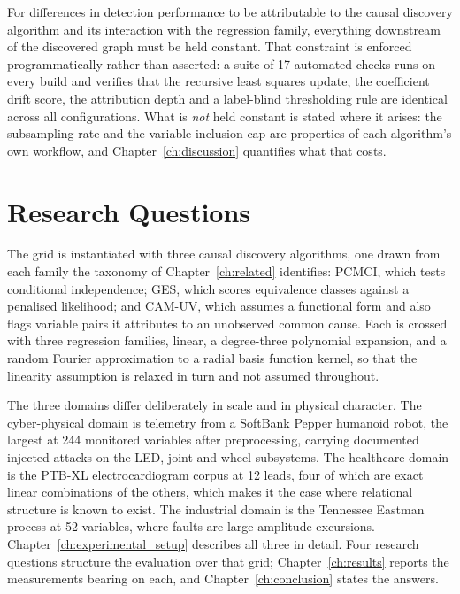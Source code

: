 For differences in detection performance to be attributable to the causal discovery algorithm and its interaction with the regression family, everything downstream of the discovered graph must be held constant. That constraint is enforced programmatically rather than asserted: a suite of 17 automated checks runs on every build and verifies that the recursive least squares update, the coefficient drift score, the attribution depth and a label-blind thresholding rule are identical across all configurations. What is \emph{not} held constant is stated where it arises: the subsampling rate and the variable inclusion cap are properties of each algorithm's own workflow, and Chapter~\ref{ch:discussion} quantifies what that costs.

\section{Research Questions}
\label{sec:rqs}

The grid is instantiated with three causal discovery algorithms, one drawn from each family the taxonomy of Chapter~\ref{ch:related} identifies: PCMCI, which tests conditional independence; GES, which scores equivalence classes against a penalised likelihood; and CAM-UV, which assumes a functional form and also flags variable pairs it attributes to an unobserved common cause. Each is crossed with three regression families, linear, a degree-three polynomial expansion, and a random Fourier approximation to a radial basis function kernel, so that the linearity assumption is relaxed in turn and not assumed throughout.

The three domains differ deliberately in scale and in physical character. The cyber-physical domain is telemetry from a SoftBank Pepper humanoid robot, the largest at 244 monitored variables after preprocessing, carrying documented injected attacks on the LED, joint and wheel subsystems. The healthcare domain is the PTB-XL electrocardiogram corpus at 12 leads, four of which are exact linear combinations of the others, which makes it the case where relational structure is known to exist. The industrial domain is the Tennessee Eastman process at 52 variables, where faults are large amplitude excursions. Chapter~\ref{ch:experimental_setup} describes all three in detail. Four research questions structure the evaluation over that grid; Chapter~\ref{ch:results} reports the measurements bearing on each, and Chapter~\ref{ch:conclusion} states the answers.

